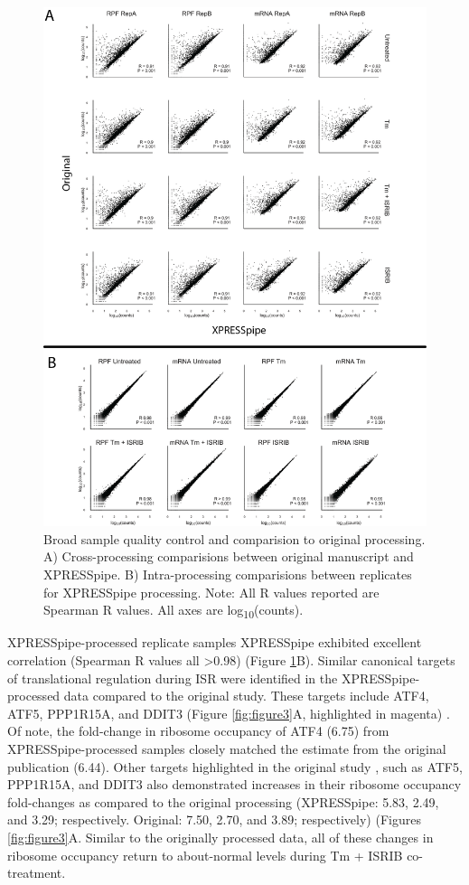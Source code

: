 \documentclass[11pt, a4paper, oneside]{article}
\begin{document}
\begin{figure}
\centering
  \includegraphics[width=160mm]{figures/xpresspipe_figure2.png}
  \caption{Broad sample quality control and comparision to original processing. A) Cross-processing comparisions between original manuscript and XPRESSpipe. B) Intra-processing comparisions between replicates for XPRESSpipe processing. Note: All R values reported are Spearman R values. All axes are log\textsubscript{10}(counts).}
  \label{fig:figure2}
\end{figure}

XPRESSpipe-processed replicate samples XPRESSpipe exhibited excellent correlation (Spearman R values all \textgreater 0.98) (Figure \ref{fig:figure2}B). Similar canonical targets of translational regulation during ISR were identified in the XPRESSpipe-processed data compared to the original study. These targets include ATF4, ATF5, PPP1R15A, and DDIT3 (Figure \ref{fig:figure3}A, highlighted in magenta) \cite{isrib_riboseq}. Of note, the fold-change in ribosome occupancy of ATF4 (6.75) from XPRESSpipe-processed samples closely matched the estimate from the original publication (6.44). Other targets highlighted in the original study \cite{isrib_riboseq}, such as ATF5, PPP1R15A, and DDIT3 also demonstrated increases in their ribosome occupancy fold-changes as compared to the original processing (XPRESSpipe: 5.83, 2.49, and 3.29; respectively. Original: 7.50, 2.70, and 3.89; respectively) (Figures \ref{fig:figure3}A. Similar to the originally processed data, all of these changes in ribosome occupancy return to about-normal levels during Tm + ISRIB co-treatment. \par
\end{document}
